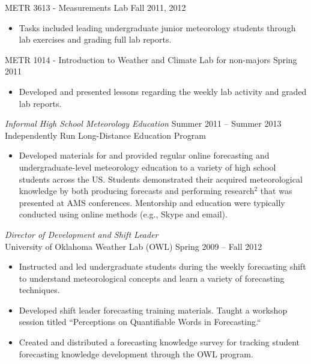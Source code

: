 \documentclass[10pt]{res} %
\begin{document}
\begin{resume}
METR 3613 - Measurements Lab \hfill Fall 2011, 2012 
\begin{itemize} \itemsep 2pt %
\item Tasks included leading undergraduate junior meteorology students through lab exercises and grading full lab reports.  
\end{itemize}

METR 1014 - Introduction to Weather and Climate Lab for non-majors \hfill Spring 2011
\begin{itemize} \itemsep 2pt %
\item Developed and presented lessons regarding the weekly lab activity and graded lab reports.
\end{itemize}
\break
{\sl  Informal High School Meteorology Education}  \hfill Summer 2011 -- Summer 2013 \\
Independently Run Long-Distance Education Program
\begin{itemize} \itemsep 2pt %
\item Developed materials for and provided regular online forecasting and undergraduate-level meteorology education to a variety of high school students across the US.  Students demonstrated their acquired meteorological knowledge by both producing forecasts and performing research$^{2}$ that was presented at AMS conferences.  Mentorship and education were typically conducted using online methods (e.g., Skype and email).
\end{itemize} 

{\sl Director of Development and Shift Leader} \\[2pt]
University of Oklahoma Weather Lab (OWL) \hfill Spring 2009 -- Fall 2012 
\begin{itemize} \itemsep 2pt %
\item Instructed and led undergraduate students during the weekly forecasting shift to understand meteorological concepts and learn a variety of forecasting techniques.
\item Developed shift leader forecasting training materials.  Taught a workshop session titled ``Perceptions on Quantifiable Words in Forecasting.``
\item Created and distributed a forecasting knowledge survey for tracking student forecasting knowledge development through the OWL program.
\end{itemize} 


\end{resume}
\end{document}
